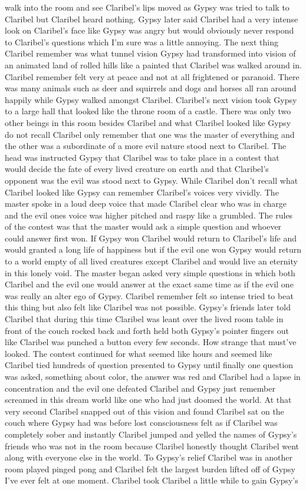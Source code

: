 \documentclass[12pt]{book}
\begin{document}
walk into the room and see Claribel's lips moved as Gypsy was tried to talk to Claribel but Claribel heard nothing. Gypsy later said Claribel had a very intense look on Claribel's face like Gypsy was angry but would obviously never respond to Claribel's questions which I'm sure was a little annoying. The next thing Claribel remember was what tunnel vision Gypsy had transformed into vision of an animated land of rolled hills like a painted that Claribel was walked around in. Claribel remember felt very at peace and not at all frightened or paranoid. There was many animals such as deer and squirrels and dogs and horses all ran around happily while Gypsy walked amongst Claribel. Claribel's next vision took Gypsy to a large hall that looked like the throne room of a castle. There was only two other beings in this room besides Claribel and what Claribel looked like Gypsy do not recall Claribel only remember that one was the master of everything and the other was a subordinate of a more evil nature stood next to Claribel. The head was instructed Gypsy that Claribel was to take place in a contest that would decide the fate of every lived creature on earth and that Claribel's opponent was the evil was stood next to Gypsy. While Claribel don't recall what Claribel looked like Gypsy can remember Claribel's voices very vividly. The master spoke in a loud deep voice that made Claribel clear who was in charge and the evil ones voice was higher pitched and raspy like a grumbled. The rules of the contest was that the master would ask a simple question and whoever could answer first won. If Gypsy won Claribel would return to Claribel's life and would granted a long life of happiness but if the evil one won Gypsy would return to a world empty of all lived creatures except Claribel and would live an eternity in this lonely void. The master began asked very simple questions in which both Claribel and the evil one would answer at the exact same time as if the evil one was really an alter ego of Gypsy. Claribel remember felt so intense tried to beat this thing but also felt like Claribel was not possible. Gypsy's friends later told Claribel that during this time Claribel was leant over the lived room table in front of the couch rocked back and forth held both Gypsy's pointer fingers out like Claribel was punched a button every few seconds. How strange that must've looked. The contest continued for what seemed like hours and seemed like Claribel tied hundreds of question presented to Gypsy until finally one question was asked, something about color, the answer was red and Claribel had a lapse in concentration and the evil one defeated Claribel and Gypsy just remember screamed in this dream world like one who had just doomed the world. At that very second Claribel snapped out of this vision and found Claribel sat on the couch where Gypsy had was before lost consciousness felt as if Claribel was completely sober and instantly Claribel jumped and yelled the names of Gypsy's friends who was not in the room because Claribel honestly thought Claribel went along with everyone else in the world. To Gypsy's relief Claribel was in another room played pinged pong and Claribel felt the largest burden lifted off of Gypsy I've ever felt at one moment. Claribel took Claribel a little while to gain Gypsy's 
\end{document}
